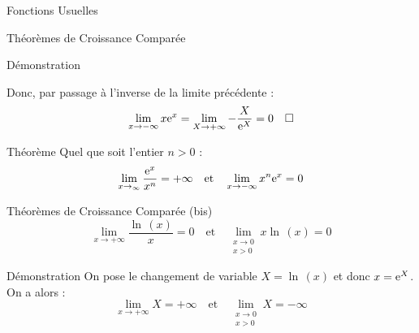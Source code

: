 \documentclass{coursbook}
\begin{document}
\begin{Gpartie}{Fonctions Usuelles}
\begin{Spartie}{Théorèmes de Croissance Comparée}
\begin{SSpartie}{Démonstration}
\begin{itemize}
                    Donc, par passage à l'inverse de la limite précédente : 
                    \[\lim\limits_{x\to-\infty}x\me^x=\lim\limits_{X\to+\infty}-\frac{X}{\me^X}=0\quad\square\]
                \end{itemize}
            \end{SSpartie}
        \end{Spartie}
        \pagebreak
        \begin{Spartie}{Théorème} 
            Quel que soit l'entier $n>0$ : \[\lim\limits_{x\to_\infty}\frac{\me^x}{x^n}=+\infty\quad\text{et}\quad\lim\limits_{x\to-\infty}x^n\me^x=0\]
        \end{Spartie}
        \begin{Spartie}{Théorèmes de Croissance Comparée (bis)} 
            \[\lim\limits_{x\to+\infty}\frac{\ln\,(x)}{x}=0\quad\text{et}\quad\lim\limits_{\substack{x\to0 \\ x>0}}x\ln\,(x)=0\]
            \begin{SSpartie}{Démonstration} 
                On pose le changement de variable $X=\ln\,(x)$ et donc $x=\mathrm{e}^X$. On a alors : \[\lim\limits_{x\to+\infty}X=+\infty\quad\text{et}\quad\lim\limits_{\substack{x\to0 \\ x>0}}X=-\infty\]
            \end{SSpartie}
        \end{Spartie}
    \end{Gpartie}
\end{document}
